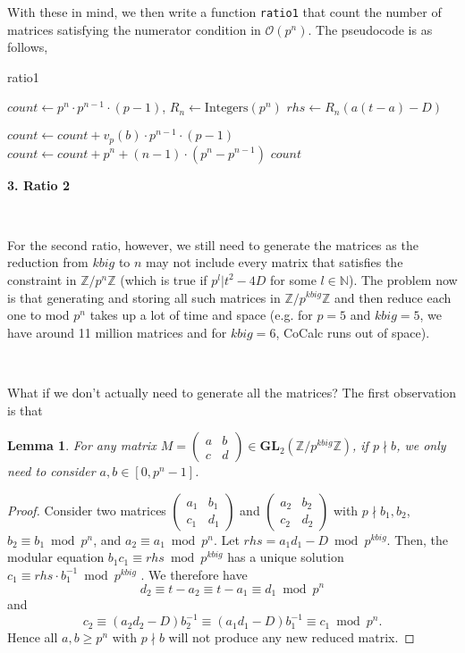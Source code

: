 \documentclass[letterpaper,12pt]{article}
\newtheorem{Lemma}{Lemma}
\newcommand{\Z}{\mathbb{Z}}
\newcommand{\bigO}{\mathcal{O}}
\newcommand{\GL}{\mathbf {GL}}
\begin{document}
With these in mind, we then write a function \texttt{ratio1}
that count the number of matrices satisfying the numerator condition in $\bigO(p^n)$.
The pseudocode is as follows,
\begin{algorithm}[H]
\caption{ratio1}
\begin{algorithmic}[1]
    \State $count \gets p^n \cdot p^{n-1} \cdot (p - 1)$, $R_n \gets \text{Integers}(p^n)$
        \State $rhs \gets R_n(a(t-a) - D)$

            \State $count \gets count + v_p(b) \cdot p^{n-1} \cdot (p - 1)$
        \Else
            \State $count \gets count + p^n + (n - 1) \cdot (p^n - p^{n-1})$
        \EndIf
    \EndFor
    \State \Return $count$
\EndFunction
\end{algorithmic}
\end{algorithm}

\newpage

{\bf \LARGE 3. Ratio 2}

\

For the second ratio, however, we still need to generate the matrices 
as the reduction from $kbig$ to $n$ may not include every matrix that satisfies the constraint 
in $\Z / p^n\Z$ (which is true if $p^l | t^2-4D$ for some $l \in \mathbb{N}$).
The problem now is that generating and storing all such matrices 
in $\Z/p^{kbig}\Z$ and then reduce each one to mod $p^n$ takes 
up a lot of time and space (e.g. for $p=5$ and $kbig=5$, we have around 11 million matrices
and for $kbig=6$, CoCalc runs out of space).

\

What if we don't actually need to generate all the matrices?
The first observation is that 
\begin{Lemma}
For any matrix $M = \begin{pmatrix} a & b \\ c & d \end{pmatrix} \in \GL_2(\Z/p^{kbig}\Z)$,
if $p \nmid b$, we only need to consider $a, b \in [0, p^n-1]$.
\end{Lemma}
\begin{proof}
Consider two matrices $\begin{pmatrix} a_1 & b_1 \\ c_1 & d_1 \end{pmatrix}$ and
$\begin{pmatrix} a_2 & b_2 \\ c_2 & d_2 \end{pmatrix}$
with $p \nmid b_1, b_2$, 
$b_2 \equiv b_1 \bmod p^n$, and $a_2 \equiv a_1 \bmod p^n$.
Let $rhs = a_1d_1-D \bmod p^{kbig}$.
Then, the modular equation $b_1c_1 \equiv rhs \bmod p^{kbig}$ has a unique solution 
$c_1 \equiv rhs \cdot b_1^{-1} \bmod p^{kbig}$ .
We therefore have
\[
d_2 \equiv t-a_2 \equiv t-a_1 \equiv d_1 \bmod p^n
\] 
and
\[
c_2 \equiv (a_2d_2 - D)b_2^{-1} 
\equiv (a_1d_1 - D)b_1^{-1} 
\equiv c_1 \bmod p^n.
\]
Hence all $a,b \geq p^n$ with $p \nmid b$ will not 
produce any new reduced matrix.
\end{proof}
\end{document}
